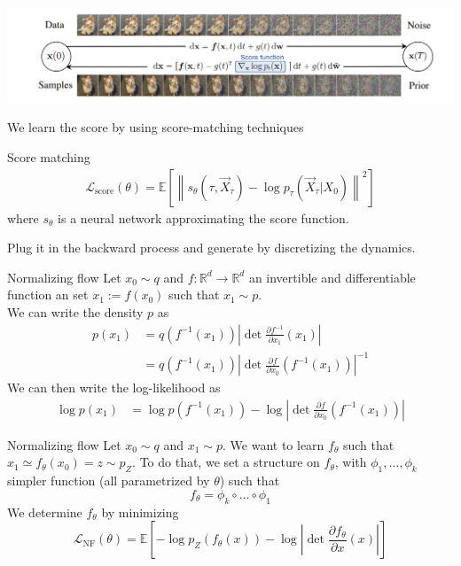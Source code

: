 \documentclass{beamer}
\begin{document}
\begin{frame}
    \includegraphics[width=1\linewidth]{score_based_dog.png}
    

    We learn the score by using score-matching techniques
    \begin{block}{Score matching}
        \begin{align}
            \mathcal{L}_\text{score}(\theta)=\mathbb{E}\left[ \left\| s_\theta \left(\tau,\overrightarrow{X}_\tau \right)-\log p_\tau \left(\overrightarrow{X}_\tau|X_0 \right)\right\|^2  \right]
        \end{align}
        where \(s_\theta\) is a neural network approximating the score function.
    \end{block}
    Plug it in the backward process and generate by discretizing the dynamics.
\end{frame}

\begin{frame}{Normalizing flow}
    Let \(x_0\sim q\) and \(f:\mathbb{R}^d\rightarrow\mathbb{R}^d\) an invertible and differentiable function an set  \(x_1:=f(x_0)\) such that \(x_1\sim p\).\\
    We can write the density \(p\) as
    \begin{align}
        p(x_1) &= q(f^{-1}(x_1))\left| \det \frac{\partial f^{-1}}{\partial x_1}(x_1)\right|\\
        &= q(f^{-1}(x_1))\left| \det \frac{\partial f}{\partial x_0}(f^{-1}(x_1))\right|^{-1} 
    \end{align}
    We can then write the log-likelihood as
    \begin{align}
        \log p(x_1) &= \log p(f^{-1}(x_1))-\log \left| \det \frac{\partial f}{\partial x_0}(f^{-1}(x_1))\right|
    \end{align}
\end{frame}

\begin{frame}{Normalizing flow}
    Let \(x_0\sim q\) and \(x_1\sim p\). We want to learn \(f_\theta\) such that \(x_1 \simeq f_\theta(x_0)=z\sim p_Z\). To do that, we set a structure on \(f_\theta\), with \(\phi_1,\ldots,\phi_k\) simpler function (all parametrized by \(\theta\)) such that 
    \[f_\theta=\phi_k\circ\ldots\circ \phi_1\] 
    We determine \(f_\theta\) by minimizing 
    \[\mathcal{L}_\text{NF}(\theta)= \mathbb{E}\left[-\log p_Z(f_\theta(x))-\log \left|\det \frac{\partial f_\theta}{\partial x}(x)\right|\right]\]
\end{frame}
\end{document}
